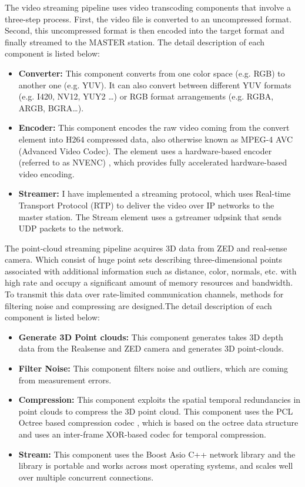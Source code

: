 The video streaming pipeline uses video transcoding components that involve a three-step process. First, the video file is converted to an uncompressed format. Second, this uncompressed format is then encoded into the target format and finally streamed to the MASTER station. The detail description of each component is listed below:
\begin{itemize}
    \item \textbf{Converter:} This component converts from one color space (e.g. RGB) to another one (e.g. YUV). It can also convert between different YUV formats (e.g. I420, NV12, YUY2 …) or RGB format arrangements (e.g. RGBA, ARGB, BGRA…).
    \item \textbf{Encoder:} This component encodes the raw video coming from the convert element into H264 compressed data, also otherwise known as MPEG-4 AVC (Advanced Video Codec). The element uses a hardware-based encoder (referred to as NVENC) \cite{pgv20181093} , which provides fully accelerated hardware-based video encoding.
    \item \textbf{Streamer:} I have implemented a streaming protocol, which uses Real-time Transport Protocol (RTP) to deliver the video over IP networks to the master station. The Stream element uses a gstreamer udpsink that sends UDP packets to the network.  

\end{itemize}

The point-cloud streaming pipeline acquires 3D data from ZED and real-sense camera. Which consist of huge point sets describing three-dimensional points associated with additional information such as distance, color, normals, etc. with high rate and occupy a significant amount of memory resources and bandwidth. To transmit this data over rate-limited communication channels, methods for filtering noise and compressing are designed.The detail description of each component is listed below: 

\begin{itemize}
    \item \textbf{Generate 3D Point clouds:} This component generates takes 3D depth data from the Realsense and ZED camera and generates 3D point-clouds.
    
    \item \textbf{Filter Noise:} This component filters noise and outliers, which are coming from measurement errors.
    \item \textbf{Compression:} This component exploits the spatial temporal redundancies in point clouds to compress the 3D point cloud. This component uses the PCL Octree based compression codec \cite{kammerl2012real}, which is based on the octree data structure and uses an inter-frame XOR-based codec for temporal compression.
    \item \textbf{Stream:} This component uses the Boost Asio C++ network library and the library is portable and works across most operating systems, and scales well over multiple concurrent connections.
\end{itemize}

